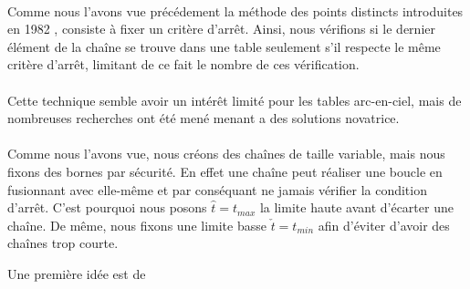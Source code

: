 \paragraph{}Comme nous l'avons vue précédement la méthode des points distincts introduites en 1982 \cite{Rivest}, consiste à fixer un critère d'arrêt. Ainsi, nous vérifions si le dernier élément de la chaîne se trouve dans une table seulement s'il respecte le même critère d'arrêt, limitant de ce fait le nombre de ces vérification.

\paragraph{}Cette technique semble avoir un intérêt limité pour les tables arc-en-ciel, mais de nombreuses recherches ont été mené menant a des solutions novatrice.

\paragraph{}Comme nous l'avons vue, nous créons des chaînes de taille variable, mais nous fixons des bornes par sécurité. En effet une chaîne peut réaliser une boucle en fusionnant avec elle-même et par conséquant ne jamais vérifier la condition d'arrêt. C'est pourquoi nous posons $\hat{t}=t_{max}$ la limite haute avant d'écarter une chaîne. De même, nous fixons une limite basse $\check{t}=t_{min}$ afin d'éviter d'avoir des chaînes trop courte.

	Une première idée est de 
	
\endinput{}
